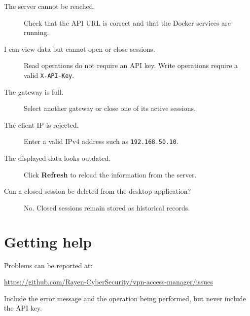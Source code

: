 \documentclass[11pt,a4paper]{article}
\begin{document}
\begin{description}

\item[The server cannot be reached.]
Check that the API URL is correct and that the Docker services are running.

\item[I can view data but cannot open or close sessions.]
Read operations do not require an API key. Write operations require a valid
\texttt{X-API-Key}.

\item[The gateway is full.]
Select another gateway or close one of its active sessions.

\item[The client IP is rejected.]
Enter a valid IPv4 address such as \texttt{192.168.50.10}.

\item[The displayed data looks outdated.]
Click \textbf{Refresh} to reload the information from the server.

\item[Can a closed session be deleted from the desktop application?]
No. Closed sessions remain stored as historical records.

\end{description}

\section*{Getting help}

Problems can be reported at:

\url{https://github.com/Rayen-CyberSecurity/vpn-access-manager/issues}

Include the error message and the operation being performed, but never include
the API key.
\end{document}
